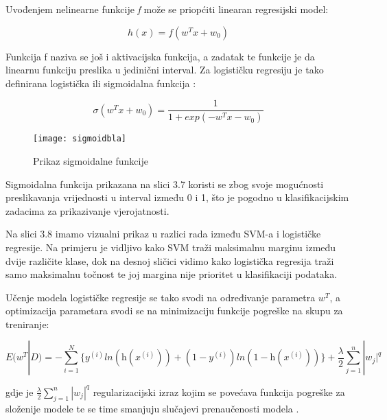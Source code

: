 \documentclass[times, utf8, zavrsni]{fer}
\begin{document}
Uvođenjem nelinearne funkcije \textit{f} može se priopćiti linearan regresijski model:

\begin{equation}
	h(x) = f(w^T x+w_{0})
\end{equation}

Funkcija f naziva se još i aktivacijska funkcija, a zadatak te funkcije je da linearnu funkciju preslika u jedinični interval. Za logističku regresiju je tako definirana logistička ili sigmoidalna funkcija \citep{logistic}:

\begin{equation}
	\sigma(w^T x+w_{0}) = \frac{1}{1+\textit{exp}(-w^T x-w_{0})}
\end{equation}\newline

\begin{figure}[h]
	\centering
	\texttt{[image: sigmoidbla]}
	\caption{Prikaz sigmoidalne funkcije \protect\footnotemark}
\end{figure}


Sigmoidalna funkcija prikazana na slici 3.7 koristi se zbog svoje mogućnosti preslikavanja vrijednosti u interval između 0 i 1, što je pogodno u klasifikacijskim zadacima za prikazivanje vjerojatnosti.

\newpage

Na slici 3.8 imamo vizualni prikaz u razlici rada između SVM-a i logističke regresije. Na primjeru je vidljivo kako SVM traži maksimalnu marginu između dvije različite klase, dok na desnoj sličici vidimo kako logistička regresija traži samo maksimalnu točnost te joj margina nije prioritet u klasifikaciji podataka. \newline

Učenje modela logističke regresije se tako svodi na određivanje parametra $w^T$, a optimizacija parametara svodi se na minimizaciju funkcije pogreške na skupu za treniranje:

\begin{equation}
	E(w^T|D) = - \sum_{i=1}^{N} \{ \textit{y}^{(i)} \textit{ln}(\textit{h}(\textit{x}^{(i)})) + (1-\textit{y}^{(i)}) \textit{ln}(1-\textit{h}(\textit{x}^{(i)})) \} + \frac{\lambda}{2} \sum_{j=1}^{n} |w_{j}|^q
\end{equation}

\noindent gdje je $ \frac{\lambda}{2} \sum_{j=1}^{n} |w_{j}|^q$ regularizacijski izraz kojim se povećava funkcija pogreške za složenije modele te se time smanjuju slučajevi prenaučenosti modela \citep{logistic}.
\end{document}
